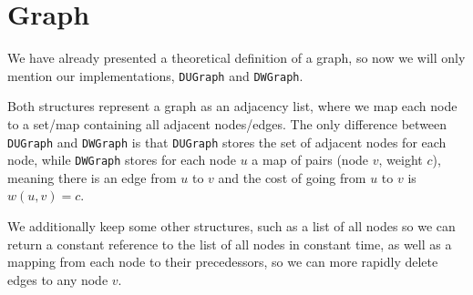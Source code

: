\section{Graph}
We have already presented a theoretical definition of a graph, so now we will only mention our implementations, \texttt{DUGraph} and \texttt{DWGraph}.\par
Both structures represent a graph as an adjacency list, where we map each node to a set/map containing all adjacent nodes/edges. The only difference between \texttt{DUGraph} and \texttt{DWGraph} is that \texttt{DUGraph} stores the set of adjacent nodes for each node, while \texttt{DWGraph} stores for each node $u$ a map of pairs (node $v$, weight $c$), meaning there is an edge from $u$ to $v$ and the cost of going from $u$ to $v$ is $w(u,v)=c$.\par
We additionally keep some other structures, such as a list of all nodes so we can return a constant reference to the list of all nodes in constant time, as well as a mapping from each node to their precedessors, so we can more rapidly delete edges to any node $v$.
